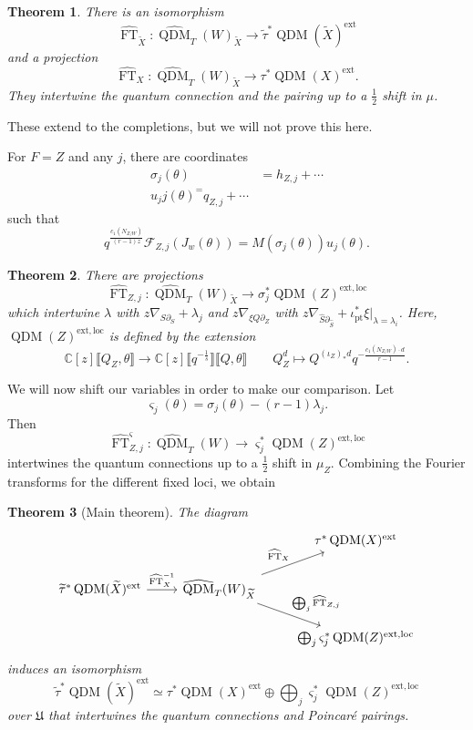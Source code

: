 \documentclass[leqno, openany]{memoir}
\newtheorem{thm}{Theorem}[section]
\theoremstyle{definition}
\theoremstyle{remark}
\theoremstyle{plain}
\theoremstyle{definition}
\theoremstyle{remark}
\newcommand{\C}{\mathbb{C}}
\newcommand{\mc}[1]{\mathcal{#1}}
\newcommand{\mf}[1]{\mathfrak{#1}}
\newcommand{\mr}[1]{\mathrm{#1}}
\newcommand{\on}[1]{\operatorname{#1}}
\newcommand{\wt}[1]{\widetilde{#1}}
\newcommand{\wh}[1]{\widehat{#1}}
\DeclareMathOperator{\QDM}{QDM}
\begin{document}
\begin{thm}
    There is an isomorphism
    \[ \wh{\on{FT}}_{\wt{X}} \colon \wh{\QDM}_T(W)_{\wt{X}} \to \wt{\tau}^* \QDM(\wt{X})^{\on{ext}} \]
    and a projection
    \[ \wh{\on{FT}}_X \colon \wh{\QDM}_T(W)_{\wt{X}} \to \tau^* \QDM(X)^{\on{ext}}. \]
    They intertwine the quantum connection and the pairing up to a $\frac{1}{2}$ shift in $\mu$.
\end{thm}

These extend to the completions, but we will not prove this here.

For $F=Z$ and any $j$, there are coordinates
\begin{align*}
    \sigma_j(\theta) &= h_{Z,j} + \cdots \\
    u_jj(\theta) ^= q_{Z,j} + \cdots
\end{align*}
such that
\[ q^{\frac{c_1(N_{Z/W})}{(r-1)z}} \mc{F}_{Z,j}(J_w(\theta)) = M(\sigma_j(\theta))u_j(\theta). \]

\begin{thm}
    There are projections
    \[ \wh{\on{FT}}_{Z,j} \colon \wh{\QDM}_T(W)_{\wt{X}} \to \sigma_j^* \QDM(Z)^{\mr{ext,loc}} \]
    which intertwine $\lambda$ with $z \nabla_{S \partial_S} + \lambda_j$ and $z \nabla_{\xi Q \partial_Z}$ with $z \nabla_{\wh{S} \partial_{\wh{S}}} + \iota_{\mr{pt}}^* \xi |_{\lambda = \lambda_i}$. Here, $\QDM(Z)^{\mr{ext,loc}}$ is defined by the extension
    \[ \C[z] \llbracket Q_Z, \theta \rrbracket \to \C[z] \llbracket q^{-\frac{1}{s}} \rrbracket \llbracket Q, \theta \rrbracket \qquad Q_Z^d \mapsto Q^{(\iota_Z)_* d} q^{-\frac{c_1(N_{Z/W})\cdot d}{r-1}}. \]
\end{thm}

We will now shift our variables in order to make our comparison. Let
\[ \varsigma_j(\theta) = \sigma_j(\theta) - (r-1)\lambda_j. \]
Then
\[ \wh{\on{FT}}_{Z,j}^{\varsigma} \colon \wh{\QDM}_T(W) \to \varsigma_j^* \QDM(Z)^{\mr{ext,loc}} \]
intertwines the quantum connections up to a $\frac{1}{2}$ shift in $\mu_Z$. Combining the Fourier transforms for the different fixed loci, we obtain

\begin{thm}[Main theorem]\label{thm:main}
    The diagram
    \begin{equation*}
    \begin{tikzcd}
        & & \tau^* \QDM(X)^{\mr{ext}} \\
        \wt{\tau}^* \QDM(\wt{X})^{\mr{ext}} \ar{r}{\wh{\on{FT}}_X^{-1}} & \wh{\QDM}_T(W)_{\wt{X}} \ar{ur}{\wh{\on{FT}}_X} \ar{dr}{\bigoplus_j \wh{\on{FT}}_{Z,j}}  \\
        & & \bigoplus_j \varsigma_j^* \QDM(Z)^{\mr{ext,loc}}
    \end{tikzcd}
    \end{equation*}
    induces an isomorphism
    \[ \wt{\tau}^* \QDM(\wt{X})^{\mr{ext}} \simeq \tau^* \QDM(X)^{\mr{ext}} \oplus \bigoplus_j \varsigma_j^* \QDM(Z)^{\mr{ext,loc}} \]
    over $\mf{U}$ that intertwines the quantum connections and Poincar\'e pairings.
\end{thm}


\printbibliography
\end{document}
